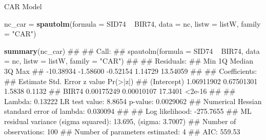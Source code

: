 \documentclass[11pt,ignorenonframetext,]{beamer}
\newenvironment{Shaded}{}{}
\newcommand{\KeywordTok}[1]{\textcolor[rgb]{0.00,0.44,0.13}{\textbf{#1}}}
\newcommand{\DataTypeTok}[1]{\textcolor[rgb]{0.56,0.13,0.00}{#1}}
\newcommand{\StringTok}[1]{\textcolor[rgb]{0.25,0.44,0.63}{#1}}
\newcommand{\OperatorTok}[1]{\textcolor[rgb]{0.40,0.40,0.40}{#1}}
\newcommand{\NormalTok}[1]{#1}
\let\oldShaded\Shaded
\let\endoldShaded\endShaded
\renewenvironment{Shaded}{\footnotesize\begin{spacing}{0.9}\oldShaded}{\endoldShaded\end{spacing}}
\let\oldverbatim\verbatim
\let\endoldverbatim\endverbatim
\newcommand{\scriptoutput}{
  \renewenvironment{Shaded}{\scriptsize\begin{spacing}{0.9}\oldShaded}{\endoldShaded\end{spacing}}
  \renewenvironment{verbatim}{\scriptsize\begin{spacing}{0.9}\oldverbatim}{\endoldverbatim\end{spacing}}
}
\begin{document}
\begin{frame}[fragile,t]{CAR Model}

\scriptoutput

\begin{Shaded}
\begin{Highlighting}[]
\NormalTok{nc_car =}\StringTok{ }\KeywordTok{spautolm}\NormalTok{(}\DataTypeTok{formula =}\NormalTok{ SID74 }\OperatorTok{~}\StringTok{ }\NormalTok{BIR74, }\DataTypeTok{data =}\NormalTok{ nc, }
                  \DataTypeTok{listw =}\NormalTok{ listW, }\DataTypeTok{family =} \StringTok{"CAR"}\NormalTok{) }

\KeywordTok{summary}\NormalTok{(nc_car)}
\NormalTok{## }
\NormalTok{## Call: }
\NormalTok{## spautolm(formula = SID74 ~ BIR74, data = nc, listw = listW, family = "CAR")}
\NormalTok{## }
\NormalTok{## Residuals:}
\NormalTok{##       Min        1Q    Median        3Q       Max }
\NormalTok{## -10.38934  -1.58600  -0.52154   1.14729  13.54059 }
\NormalTok{## }
\NormalTok{## Coefficients: }
\NormalTok{##               Estimate Std. Error z value Pr(>|z|)}
\NormalTok{## (Intercept) 1.06911902 0.67501301  1.5838   0.1132}
\NormalTok{## BIR74       0.00175249 0.00010107 17.3401   <2e-16}
\NormalTok{## }
\NormalTok{## Lambda: 0.13222 LR test value: 8.8654 p-value: 0.0029062 }
\NormalTok{## Numerical Hessian standard error of lambda: 0.030094 }
\NormalTok{## }
\NormalTok{## Log likelihood: -275.7655 }
\NormalTok{## ML residual variance (sigma squared): 13.695, (sigma: 3.7007)}
\NormalTok{## Number of observations: 100 }
\NormalTok{## Number of parameters estimated: 4 }
\NormalTok{## AIC: 559.53}
\end{Highlighting}
\end{Shaded}

\end{frame}
\end{document}
